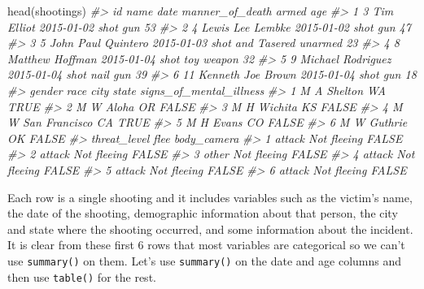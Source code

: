 \documentclass[
]{krantz}
\makeatletter
\newenvironment{Shaded}{\begin{snugshade}}{\end{snugshade}}
\newcommand{\CommentTok}[1]{\textcolor[rgb]{0.37,0.37,0.37}{\textit{#1}}}
\newcommand{\FunctionTok}[1]{\textcolor[rgb]{0,0,0}{#1}}
\newcommand{\NormalTok}[1]{#1}
\newenvironment{kframe}{%
\medskip{}
\setlength{\fboxsep}{.8em}
 \def\at@end@of@kframe{}%
 \ifinner\ifhmode%
  \def\at@end@of@kframe{\end{minipage}}%
  \begin{minipage}{\columnwidth}%
 \fi\fi%
 \def\FrameCommand##1{\hskip\@totalleftmargin \hskip-\fboxsep
 \colorbox{shadecolor}{##1}\hskip-\fboxsep
     \hskip-\linewidth \hskip-\@totalleftmargin \hskip\columnwidth}%
 \MakeFramed {\advance\hsize-\width
   \@totalleftmargin\z@ \linewidth\hsize
   \@setminipage}}%
 {\par\unskip\endMakeFramed%
 \at@end@of@kframe}
\renewenvironment{Shaded}{\begin{kframe}}{\end{kframe}}
\makeatother
\begin{document}
\begin{Shaded}
\begin{Highlighting}[]
\FunctionTok{head}\NormalTok{(shootings)}
\CommentTok{\#\textgreater{}   id               name       date  manner\_of\_death      armed age}
\CommentTok{\#\textgreater{} 1  3         Tim Elliot 2015{-}01{-}02             shot        gun  53}
\CommentTok{\#\textgreater{} 2  4   Lewis Lee Lembke 2015{-}01{-}02             shot        gun  47}
\CommentTok{\#\textgreater{} 3  5 John Paul Quintero 2015{-}01{-}03 shot and Tasered    unarmed  23}
\CommentTok{\#\textgreater{} 4  8    Matthew Hoffman 2015{-}01{-}04             shot toy weapon  32}
\CommentTok{\#\textgreater{} 5  9  Michael Rodriguez 2015{-}01{-}04             shot   nail gun  39}
\CommentTok{\#\textgreater{} 6 11  Kenneth Joe Brown 2015{-}01{-}04             shot        gun  18}
\CommentTok{\#\textgreater{}   gender race          city state signs\_of\_mental\_illness}
\CommentTok{\#\textgreater{} 1      M    A       Shelton    WA                    TRUE}
\CommentTok{\#\textgreater{} 2      M    W         Aloha    OR                   FALSE}
\CommentTok{\#\textgreater{} 3      M    H       Wichita    KS                   FALSE}
\CommentTok{\#\textgreater{} 4      M    W San Francisco    CA                    TRUE}
\CommentTok{\#\textgreater{} 5      M    H         Evans    CO                   FALSE}
\CommentTok{\#\textgreater{} 6      M    W       Guthrie    OK                   FALSE}
\CommentTok{\#\textgreater{}   threat\_level        flee body\_camera}
\CommentTok{\#\textgreater{} 1       attack Not fleeing       FALSE}
\CommentTok{\#\textgreater{} 2       attack Not fleeing       FALSE}
\CommentTok{\#\textgreater{} 3        other Not fleeing       FALSE}
\CommentTok{\#\textgreater{} 4       attack Not fleeing       FALSE}
\CommentTok{\#\textgreater{} 5       attack Not fleeing       FALSE}
\CommentTok{\#\textgreater{} 6       attack Not fleeing       FALSE}
\end{Highlighting}
\end{Shaded}

Each row is a single shooting and it includes variables such as the victim's name, the date of the shooting, demographic information about that person, the city and state where the shooting occurred, and some information about the incident. It is clear from these first 6 rows that most variables are categorical so we can't use \texttt{summary()} on them. Let's use \texttt{summary()} on the date and age columns and then use \texttt{table()} for the rest.
\end{document}

